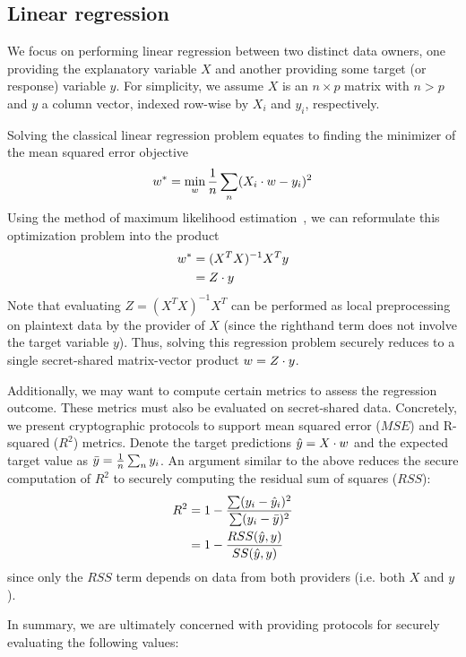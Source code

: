 
\subsection{Linear regression}
\label{sec:linreg}

We focus on performing linear regression between two distinct data owners, one providing the explanatory variable $X$ and another providing some target (or response) variable $y$. For simplicity, we assume $X$ is an $n \times p$ matrix with $n > p$ and $y$ a column vector, indexed row-wise by $X_i$ and $y_i$, respectively.

Solving the classical linear regression problem equates to finding the minimizer of the mean squared error objective
\begin{align*}
w^* = \min_{w}\frac{1}{n} \sum_n (X_i \cdot w - y_i)^2
\end{align*}
Using the method of maximum likelihood estimation~\cite{mml}, we can reformulate this optimization problem into the product
\begin{align*}
w^* &= (X^TX)^{-1}X^Ty
\\
&= Z \cdot y
\end{align*}
Note that evaluating $Z = (X^TX)^{-1}X^T$ can be performed as local preprocessing on plaintext data by the provider of $X$ (since the righthand term does not involve the target variable $y$). Thus, solving this regression problem securely reduces to a single secret-shared matrix-vector product $w = Z \cdot y$.

Additionally, we may want to compute certain metrics to assess the regression outcome. These metrics must also be evaluated on secret-shared data. Concretely, we present cryptographic protocols to support mean squared error ($MSE$) and R-squared ($R^2$) metrics. Denote the target predictions $\hat{y} = X \cdot w$ and the expected target value as $\bar{y} = \frac{1}{n} \sum_n y_i$. An argument similar to the above reduces the secure computation of $R^2$ to securely computing the residual sum of squares ($RSS$):
\begin{align*}
R^2 &= 1 - \frac{\sum(y_i - \hat{y}_i)^2}{\sum(y_i - \bar{y})^2}
\\
&= 1 - \frac{RSS(\hat{y}, y)}{SS(\hat{y}, y)}
\end{align*}
since only the $RSS$ term depends on data from both providers (i.e. both $X$ and $y$). 

In summary, we are ultimately concerned with providing protocols for securely evaluating the following values:

